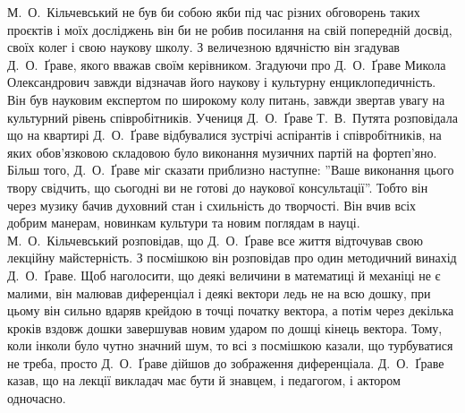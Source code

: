 \documentclass[11pt, reqno]{amsart}
\begin{document}
М.~О.~Кільчевський не був би собою якби під час різних обговорень таких проєктів і моїх досліджень він би не робив посилання на свій попередній досвід, своїх колег і свою наукову школу. З величезною вдячністю він згадував Д.~О.~Ґраве, якого вважав своїм керівником. Згадуючи про Д.~О.~Ґраве Микола Олександрович завжди відзначав його наукову і культурну енциклопедичність. Він був науковим експертом по широкому колу питань, завжди звертав увагу на культурний рівень співробітників. Учениця Д.~О.~Ґраве Т.~В.~Путята розповідала що на квартирі Д.~О.~Ґраве відбувалися зустрічі аспірантів і співробітників, на яких обов'язковою складовою було виконання музичних партій на фортеп'яно. Більш того, Д.~О.~Ґраве міг сказати приблизно наступне: ''Ваше виконання цього твору свідчить, що сьогодні ви не готові до наукової консультації''. Тобто він через музику бачив духовний стан і схильність до творчості. Він вчив всіх добрим манерам, новинкам культури та новим поглядам в науці. М.~О.~Кільчевський розповідав, що Д.~О.~Ґраве все життя відточував свою лекційну майстерність. З посмішкою він розповідав про один методичний винахід Д.~О.~Ґраве. Щоб наголосити, що деякі величини в математиці й механіці не є малими, він малював диференціал і деякі вектори ледь не на всю дошку, при цьому він сильно вдаряв крейдою в точці початку вектора, а потім через декілька кроків вздовж дошки завершував новим ударом по дошці кінець вектора. Тому, коли інколи було чутно значний шум, то всі з посмішкою казали, що турбуватися не треба, просто Д.~О.~Ґраве дійшов до зображення диференціала. Д.~О.~Ґраве казав, що на лекції викладач має бути й знавцем, і педагогом, і актором одночасно.
\end{document}

